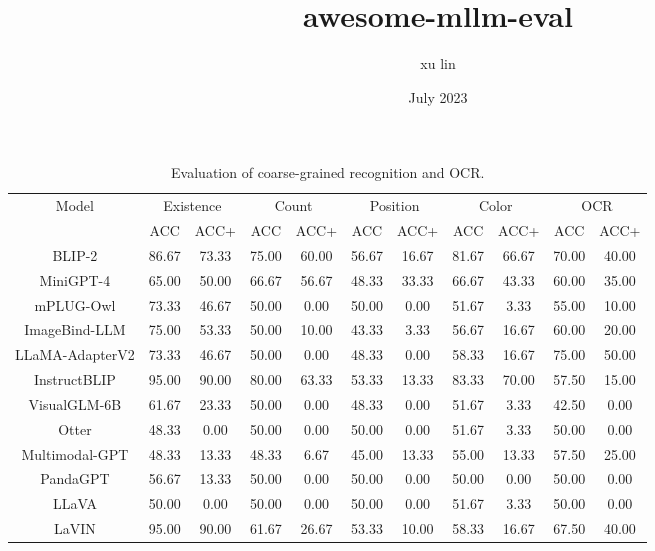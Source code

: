 \documentclass{article}
\title{awesome-mllm-eval}
\author{xu lin}
\date{July 2023}
\begin{document}
\begin{table}[]
    \centering
    \begin{center}
        \begin{adjustbox}{max width=0.85\textwidth}
            \begin{tabular}{c|cc|cc|cc|cc|cc}
                \toprule
                \multirow{2}{*}{Model}&\multicolumn{2}{c|}{Existence}&\multicolumn{2}{c|}{Count}&\multicolumn{2}{c|}{Position}&\multicolumn{2}{c|}{Color}&\multicolumn{2}{c}{OCR}\\
                &ACC&ACC+&ACC&ACC+&ACC&ACC+&ACC&ACC+&ACC&ACC+\\
                \midrule
                BLIP-2		&86.67&73.33&75.00&60.00&56.67&16.67&81.67&66.67&70.00&40.00\\
                MiniGPT-4	&65.00&50.00 &66.67&56.67&48.33 &33.33&66.67&43.33&60.00&35.00\\
                mPLUG-Owl	&73.33&46.67&50.00&0.00&50.00&0.00&51.67&3.33&55.00&10.00\\
                ImageBind-LLM &75.00&53.33 &50.00 &10.00 &43.33 &3.33 &56.67 &16.67 &60.00 &20.00 \\
                LLaMA-AdapterV2 &73.33 &46.67 &50.00 &0.00 &48.33 &0.00 &58.33 &16.67 &75.00 &50.00 \\
                InstructBLIP &95.00&90.00&80.00&63.33&53.33&13.33&83.33&70.00&57.50&15.00\\
                VisualGLM-6B &61.67&23.33&50.00&0.00&48.33&0.00&51.67&3.33&42.50&0.00\\
                Otter&48.33  &0.00 &50.00&0.00&50.00&0.00&51.67&3.33&50.00&0.00\\
                Multimodal-GPT 
                &48.33&13.33 &48.33&6.67 &45.00&13.33 &55.00&13.33 &57.50&25.00 \\
                PandaGPT &56.67&13.33&50.00&0.00&50.00&0.00&50.00&0.00&50.00&0.00\\
                LLaVA	 &50.00&0.00&50.00&0.00&50.00&0.00&51.67&3.33&50.00&0.00\\
                LaVIN    &95.00 &90.00 &61.67 &26.67 &53.33 &10.00 &58.33 &16.67 &67.50 &40.00 \\
                
                \bottomrule
            \end{tabular}%
        \end{adjustbox}
    \end{center}
    \caption{Evaluation of coarse-grained recognition and OCR.}
    \label{table-1}
\end{table}
\end{document}
